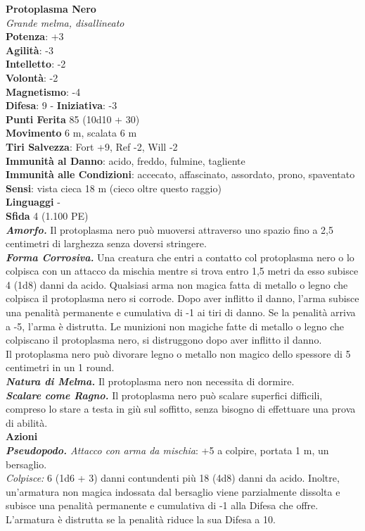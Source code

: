 \begin{multicols}{2}
\medskip\textbf{Protoplasma Nero}\\
\emph{Grande melma, disallineato}\\
\textbf{Potenza}: +3\\
\textbf{Agilità}: -3\\
\textbf{Intelletto}: -2\\
\textbf{Volontà}: -2\\
\textbf{Magnetismo}: -4\\
\textbf{Difesa}: 9 - \textbf{Iniziativa}: -3\\
\textbf{Punti Ferita} 85 (10d10 + 30)\\
\textbf{Movimento} 6 m, scalata 6 m\\
\textbf{Tiri Salvezza}: Fort +9, Ref -2, Will -2\\
\textbf{Immunità al Danno}: acido, freddo, fulmine, tagliente\\
\textbf{Immunità alle Condizioni}: accecato, affascinato, assordato, prono, spaventato
\textbf{Sensi}: vista cieca 18 m (cieco oltre questo raggio)\\
\textbf{Linguaggi} -\\
\textbf{Sfida} 4 (1.100 PE)\smallskip\\
\emph{\textbf{Amorfo.}} Il protoplasma nero può muoversi attraverso uno spazio fino a 2,5 centimetri di larghezza senza doversi stringere.\\
\emph{\textbf{Forma Corrosiva.}} Una creatura che entri a contatto col protoplasma nero o lo colpisca con un attacco da mischia mentre si trova entro 1,5 metri da esso subisce 4 (1d8) danni da acido. Qualsiasi arma non magica fatta di metallo o legno che colpisca il protoplasma nero si corrode. Dopo aver inflitto il danno, l'arma subisce una penalità permanente e cumulativa di -1 ai tiri di danno. Se la penalità arriva a -5, l'arma è distrutta. Le munizioni non magiche fatte di metallo o legno che colpiscano il protoplasma nero, si distruggono dopo aver inflitto il danno. \\
Il protoplasma nero può divorare legno o metallo non magico dello spessore di 5 centimetri in un 1 round.\\
\emph{\textbf{Natura di Melma.}} Il protoplasma nero non necessita di dormire.\\
\emph{\textbf{Scalare come Ragno.}} Il protoplasma nero può scalare superfici difficili, compreso lo stare a testa in giù sul soffitto, senza bisogno di effettuare una prova di abilità.\\
\smallskip\textbf{Azioni}\\
\emph{\textbf{Pseudopodo.} Attacco con arma da mischia}: +5 a colpire, portata 1 m, un bersaglio.\\
\emph{Colpisce:} 6 (1d6 + 3) danni contundenti più 18 (4d8) danni da acido. Inoltre, un'armatura non magica indossata dal bersaglio viene parzialmente dissolta e subisce una penalità permanente e cumulativa di -1 alla Difesa che offre. L'armatura è distrutta se la penalità riduce la sua Difesa a 10.\\


\end{multicols}
